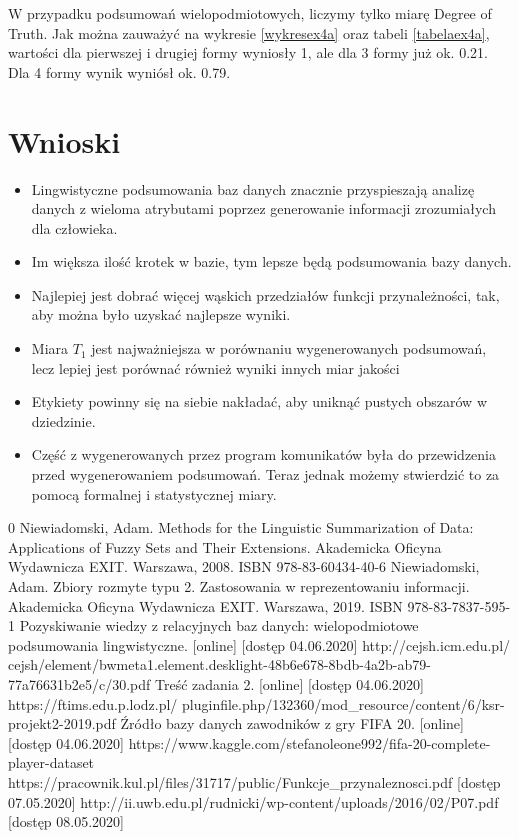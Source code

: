 \documentclass{classrep}
\begin{document}
	W przypadku podsumowań wielopodmiotowych, liczymy tylko miarę Degree of Truth. Jak można zauważyć na wykresie \ref{wykresex4a} oraz tabeli \ref{tabelaex4a}, wartości dla pierwszej i drugiej formy wyniosły 1, ale dla 3 formy już ok. 0.21. Dla 4 formy wynik wyniósł ok. 0.79.
	
	\section{Wnioski}
	\begin{itemize}
		\item Lingwistyczne podsumowania baz danych znacznie przyspieszają analizę danych z wieloma atrybutami poprzez generowanie informacji zrozumiałych dla człowieka. 
		\item Im większa ilość krotek w bazie, tym lepsze będą podsumowania bazy danych.
		\item Najlepiej jest dobrać więcej wąskich przedziałów funkcji przynależności, tak, aby można było uzyskać najlepsze wyniki.
		\item Miara $T_1$ jest najważniejsza w porównaniu wygenerowanych podsumowań, lecz lepiej jest porównać również wyniki innych miar jakości
		\item Etykiety powinny się na siebie nakładać, aby uniknąć pustych obszarów w dziedzinie.
		\item Część z wygenerowanych przez program komunikatów była do przewidzenia przed wygenerowaniem podsumowań. Teraz jednak możemy stwierdzić to za pomocą formalnej i statystycznej miary.
	\end{itemize}

	\newpage
	\begin{thebibliography} {0}
		 Niewiadomski, Adam. Methods for the Linguistic Summarization of Data: Applications of Fuzzy Sets and Their Extensions. Akademicka Oficyna Wydawnicza EXIT. Warszawa, 2008. ISBN 978-83-60434-40-6
		 Niewiadomski, Adam. Zbiory rozmyte typu 2. Zastosowania w reprezentowaniu informacji. Akademicka Oficyna Wydawnicza EXIT. Warszawa, 2019. ISBN 978-83-7837-595-1
		 Pozyskiwanie wiedzy z relacyjnych baz danych: wielopodmiotowe podsumowania lingwistyczne. [online]  [dostęp 04.06.2020]
		http://cejsh.icm.edu.pl/
		cejsh/element/bwmeta1.element.desklight-48b6e678-8bdb-4a2b-ab79-
		77a76631b2e5/c/30.pdf
		 Treść zadania 2. [online] [dostęp 04.06.2020] https://ftims.edu.p.lodz.pl/
		pluginfile.php/132360/mod\_resource/content/6/ksr-projekt2-2019.pdf
		 Źródło bazy danych zawodników z gry FIFA 20. [online] [dostęp 04.06.2020] https://www.kaggle.com/stefanoleone992/fifa-20-complete-player-dataset
		 https://pracownik.kul.pl/files/31717/public/Funkcje\_przynaleznosci.pdf [dostęp 07.05.2020]
		 http://ii.uwb.edu.pl/rudnicki/wp-content/uploads/2016/02/P07.pdf [dostęp 08.05.2020]
	\end{thebibliography}
\end{document}
